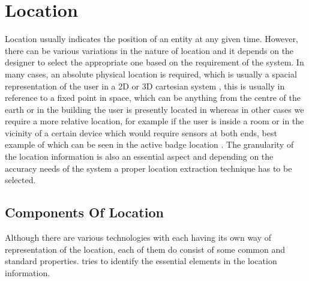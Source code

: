 \documentclass[12pt]{report}
\begin{document}
\section{Location}

Location usually indicates the position of an entity at any given time. However, there can be various variations in the nature of location and it depends on the designer to select the appropriate one based on the requirement of the system. In many cases, an absolute physical location is required, which is usually a spacial representation of the user in a 2D or 3D cartesian system \cite{rodden1998exploiting}, this is usually in reference to a fixed point in space, which can be anything from the centre of the earth or in the building the user is presently located in whereas in other cases we require a more relative location, for example if the user is inside a room or in the vicinity of a certain device which would require sensors at both ends, best example of which can be seen in the active badge location \cite{want1992active}. The granularity of the location information is also an essential aspect and depending on the accuracy needs of the system a proper location extraction technique has to be selected.


\subsection{Components Of Location}

Although there are various technologies with each having its own way of representation of the location, each of them do consist of some common and standard properties. \cite{schiller2004location} tries to identify the essential elements in the location information.
\end{document}
